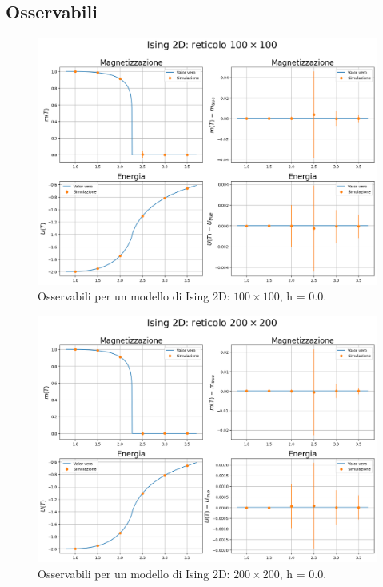 \vspace*{\fill}

\newpage
\subsection{Osservabili}

\vspace*{\fill}

\begin{figure}[htpb]
    \centering
    \includegraphics[page=1, width=\textwidth]{Immagini/simIsing2D/obs/obs_100.png}
    \caption{Osservabili per un modello di Ising 2D: $100 \times 100$, h = 0.0.}
\end{figure}

\vspace*{\fill}



\vspace*{\fill}

\begin{figure}[htpb]
    \centering
    \includegraphics[page=1, width=\textwidth]{Immagini/simIsing2D/obs/obs_200.png}
    \caption{Osservabili per un modello di Ising 2D: $200 \times 200$, h = 0.0.}
\end{figure}

